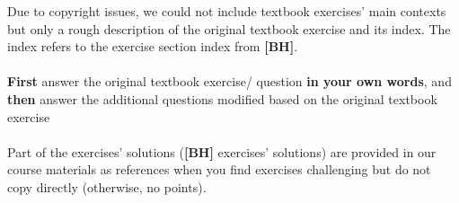 Due to copyright issues, we could not include textbook exercises' main contexts but only a rough description of the original textbook exercise and its index. The index refers to the exercise section index from \textbf{[BH]}.\\~\\
\textbf{First} answer the original textbook exercise/ question \textbf{in your own words}, and \textbf{then} answer the additional questions modified based on the original textbook exercise\\~\\
Part of the exercises' solutions (\textbf{[BH]} exercises' solutions)  are provided in our course materials as references when you find exercises challenging but do not copy directly (otherwise, no points). \\~\\